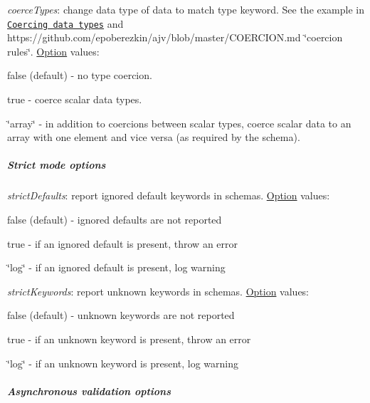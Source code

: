 \begin{DoxyItemize}
\item {\itshape coerce\+Types}\+: change data type of data to match {\ttfamily type} keyword. See the example in \href{#coercing-data-types}{\tt Coercing data types} and https\+://github.com/epoberezkin/ajv/blob/master/\+C\+O\+E\+R\+C\+I\+O\+N.\+md \char`\"{}coercion rules\char`\"{}. \mbox{\hyperlink{structOption}{Option}} values\+:
\begin{DoxyItemize}
\item {\ttfamily false} (default) -\/ no type coercion.
\item {\ttfamily true} -\/ coerce scalar data types.
\item {\ttfamily \char`\"{}array\char`\"{}} -\/ in addition to coercions between scalar types, coerce scalar data to an array with one element and vice versa (as required by the schema).
\end{DoxyItemize}
\end{DoxyItemize}

\subparagraph*{Strict mode options}


\begin{DoxyItemize}
\item {\itshape strict\+Defaults}\+: report ignored {\ttfamily default} keywords in schemas. \mbox{\hyperlink{structOption}{Option}} values\+:
\begin{DoxyItemize}
\item {\ttfamily false} (default) -\/ ignored defaults are not reported
\item {\ttfamily true} -\/ if an ignored default is present, throw an error
\item {\ttfamily \char`\"{}log\char`\"{}} -\/ if an ignored default is present, log warning
\end{DoxyItemize}
\item {\itshape strict\+Keywords}\+: report unknown keywords in schemas. \mbox{\hyperlink{structOption}{Option}} values\+:
\begin{DoxyItemize}
\item {\ttfamily false} (default) -\/ unknown keywords are not reported
\item {\ttfamily true} -\/ if an unknown keyword is present, throw an error
\item {\ttfamily \char`\"{}log\char`\"{}} -\/ if an unknown keyword is present, log warning
\end{DoxyItemize}
\end{DoxyItemize}

\subparagraph*{Asynchronous validation options}


